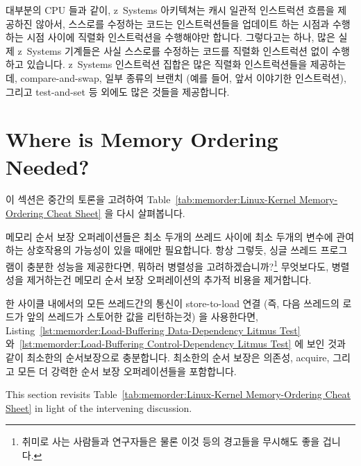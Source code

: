 대부분의 CPU 들과 같이, z~Systems 아키텍쳐는 캐시 일관적 인스트럭션 흐름을
제공하진 않아서, 스스로를 수정하는 코드는 인스트럭션들을 업데이트 하는 시점과
수행하는 시점 사이에 직렬화 인스트럭션을 수행해야만 합니다.
그렇다고는 하나, 많은 실제 z~Systems 기계들은 사실 스스로를 수정하는 코드를
직렬화 인스트럭션 없이 수행하고 있습니다.
z~Systems 인스트럭션 집합은 많은 직렬화 인스트럭션들을 제공하는데,
compare-and-swap, 일부 종류의 브랜치 (예를 들어, 앞서 이야기한 
인스트럭션), 그리고 test-and-set 등 외에도 많은 것들을 제공합니다.

\section{Where is Memory Ordering Needed?}
\label{sec:memorder:Where is Memory Ordering Needed?}

이 섹션은 중간의 토론을 고려하여
Table~\ref{tab:memorder:Linux-Kernel Memory-Ordering Cheat Sheet}
을 다시 살펴봅니다.

메모리 순서 보장 오퍼레이션들은 최소 두개의 쓰레드 사이에 최소 두개의 변수에
관여하는 상호작용의 가능성이 있을 때에만 필요합니다.
항상 그렇듯, 싱글 쓰레드 프로그램이 충분한 성능을 제공한다면, 뭐하러 병렬성을
고려하겠습니까?\footnote{
	취미로 사는 사람들과 연구자들은 물론 이것 등의 경고들을 무시해도
	좋을 겁니다.}
무엇보다도, 병렬성을 제거하는건 메모리 순서 보장 오퍼레이션의 추가적 비용을
제거합니다.

한 사이클 내에서의 모든 쓰레드간의 통신이 store-to-load 연결 (즉, 다음 쓰레드의
로드가 앞의 쓰레드가 스토어한 값을 리턴하는것) 을 사용한다면,
Listing~\ref{lst:memorder:Load-Buffering Data-Dependency Litmus Test}
와~\ref{lst:memorder:Load-Buffering Control-Dependency Litmus Test} 에 보인
것과 같이 최소한의 순서보장으로 충분합니다.
최소한의 순서 보장은 의존성, acquire, 그리고 모든 더 강력한 순서 보장
오퍼레이션들을 포함합니다.
\iffalse

This section revisits
Table~\ref{tab:memorder:Linux-Kernel Memory-Ordering Cheat Sheet}
in light of the intervening discussion.

